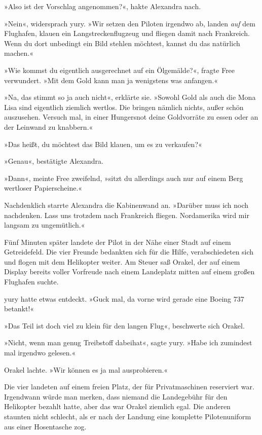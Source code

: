 »Also ist der Vorschlag angenommen?«, hakte Alexandra nach.

»Nein«, widersprach yury. »Wir setzen den Piloten irgendwo ab, landen \emph{auf} dem Flughafen, klauen ein Langstreckenflugzeug und fliegen damit nach Frankreich. Wenn du dort unbedingt ein Bild stehlen möchtest, kannst du das natürlich machen.«

»Wie kommst du eigentlich ausgerechnet auf ein Ölgemälde?«, fragte Free verwundert. »Mit dem Gold kann man ja wenigstens was anfangen.«

»Na, das stimmt so ja auch nicht«, erklärte sie. »Sowohl Gold als auch die Mona Lisa sind eigentlich ziemlich wertlos. Die bringen nämlich nichts, außer schön auszusehen. Versuch mal, in einer Hungersnot deine Goldvorräte zu essen oder an der Leinwand zu knabbern.«

»Das heißt, du möchtest das Bild klauen, um es zu verkaufen?«

»Genau«, bestätigte Alexandra.

»Dann«, meinte Free zweifelnd, »sitzt du allerdings auch nur auf einem Berg wertloser Papierscheine.«

Nachdenklich starrte Alexandra die Kabinenwand an. »Darüber muss ich noch nachdenken. Lass uns trotzdem nach Frankreich fliegen. Nordamerika wird mir langsam zu ungemütlich.«

Fünf Minuten später landete der Pilot in der Nähe einer Stadt auf einem Getreidefeld. Die vier Freunde bedankten sich für die Hilfe, verabschiedeten sich und flogen mit dem Helikopter weiter. Am Steuer saß Orakel, der auf einem Display bereits voller Vorfreude nach einem Landeplatz mitten auf einem großen Flughafen suchte.

yury hatte etwas entdeckt. »Guck mal, da vorne wird gerade eine Boeing 737 betankt!«

»Das Teil ist doch viel zu klein für den langen Flug«, beschwerte sich Orakel.

»Nicht, wenn man genug Treibstoff dabeihat«, sagte yury. »Habe ich zumindest mal irgendwo gelesen.«

Orakel lachte. »Wir können es ja mal ausprobieren.«

Die vier landeten auf einem freien Platz, der für Privatmaschinen reserviert war. Irgendwann würde man merken, dass niemand die Landegebühr für den Helikopter bezahlt hatte, aber das war Orakel ziemlich egal. Die anderen staunten nicht schlecht, als er nach der Landung eine komplette Pilotenuniform aus einer Hosentasche zog.

